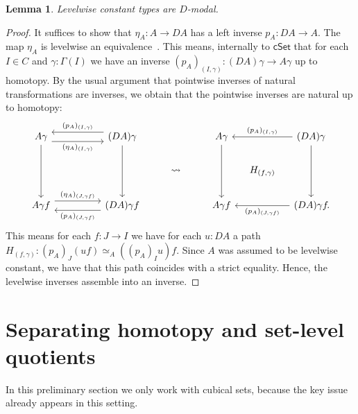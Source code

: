 \documentclass[10pt,a4paper]{article}
\newtheorem{lemma}{Lemma}[section]
\newcommand{\cSet}{\mathsf{cSet}}
\begin{document}
\begin{lemma}\label{prop:levelwise-constant-presheaves-are-modal}
  Levelwise constant types are \(D\)-modal.
\end{lemma}
\begin{proof}
  It suffices to show that \(\eta_A \colon A \to DA\) has a left inverse \(p_A \colon DA \to A\).
  The map \(\eta_A\) is levelwise an equivalence~\cite[Proposition~3.8]{CRS21}.
  This means, internally to \(\cSet\) that for each \(I \in C\) and \(\gamma \colon \Gamma(I)\) we have an inverse \((p_A)_{(I, \gamma)} \colon (DA)\gamma \to A\gamma\) up to homotopy.
  By the usual argument that pointwise inverses of natural transformations are inverses, we obtain that the pointwise inverses are natural up to homotopy:
  \[\begin{tikzcd}
    {A\gamma} && {(DA)\gamma} && {A\gamma} && {(DA)\gamma} \\
    &&& \rightsquigarrow && {\clap{\(H_{(f, \gamma)}\)}} \\
    {A\gamma f} && {(DA)\gamma f} && {A\gamma f} && {(DA)\gamma f\clap{.}}
    \arrow[""{name=0, anchor=center, inner sep=0}, "{(\eta_A)_{(I, \gamma)}}"', shift right=2, from=1-1, to=1-3]
    \arrow[from=1-1, to=3-1]
    \arrow[""{name=1, anchor=center, inner sep=0}, "{(p_A)_{(I, \gamma)}}"', shift right=2, from=1-3, to=1-1]
    \arrow[from=1-3, to=3-3]
    \arrow[from=1-5, to=3-5]
    \arrow["{(p_A)_{(I, \gamma)}}"', from=1-7, to=1-5]
    \arrow[from=1-7, to=3-7]
    \arrow[""{name=2, anchor=center, inner sep=0}, "{(\eta_A)_{(J, \gamma f)}}", shift left=2, from=3-1, to=3-3]
    \arrow[""{name=3, anchor=center, inner sep=0}, "{(p_A)_{(J, \gamma f)}}", shift left=2, from=3-3, to=3-1]
    \arrow["{(p_A)_{(J, \gamma f)}}", from=3-7, to=3-5]
  \end{tikzcd}\]
  This means for each \(f \colon J \to I\) we have for each \(u \colon DA\) a path \(H_{(f, \gamma)} \colon (p_A)_J(uf) \simeq_{A} ((p_A)_Iu)f\).
  Since \(A\) was assumed to be levelwise constant, we have that this path coincides with a strict equality.
  Hence, the levelwise inverses assemble into an inverse.
\end{proof}



\section{Separating homotopy and set-level quotients}\label{sec:cset-homotopy-quotient-vs-meta-quotient}

In this preliminary section we only work with cubical sets, because the key issue already appears in this setting.
\end{document}
